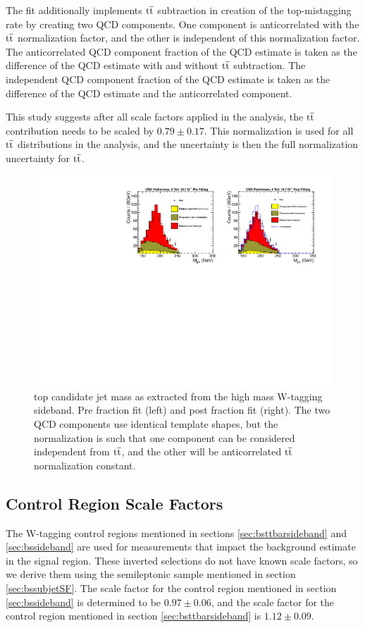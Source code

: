 The fit additionally implements $\mathrm{t\overline{t}}$ subtraction in creation of the top-mistagging rate by creating two QCD components.  One component is anticorrelated 
with the $\mathrm{t\overline{t}}$ normalization factor, and the other is independent of this normalization factor.  The anticorrelated QCD component fraction of the QCD estimate 
is taken as the difference of the QCD estimate with and without $\mathrm{t\overline{t}}$ subtraction.  The independent QCD component fraction of the QCD estimate is taken as the 
difference of the QCD estimate and the anticorrelated component.  

This study suggests after all scale factors applied in the analysis, the $\mathrm{t\overline{t}}$ contribution needs to be scaled by $0.79 \pm 0.17$.  
This normalization is used for all $\mathrm{t\overline{t}}$ distributions in the analysis, and the uncertainty is then the full normalization uncertainty for $\mathrm{t\overline{t}}$.

\begin{figure}[htcb]
\centering
\includegraphics[width=1.0\textwidth]{AN-14-049/figs/ttbarfittingfromtheta.pdf}
\caption{top candidate jet mass as extracted from the high mass W-tagging sideband.  Pre fraction fit (left) and post fraction fit (right).  The two QCD components use identical template shapes,
but the normalization is such that one component can be considered independent from $\mathrm{t\overline{t}}$, and the other will be anticorrelated $\mathrm{t\overline{t}}$ normalization constant. }
\label{figs:bsttbarfit}
\end{figure}

\subsection{Control Region Scale Factors}
\label{sec:bsCRSF}
The W-tagging control regions mentioned in sections \ref{sec:bsttbarsideband} and \ref{sec:bssideband} are used for measurements that impact the background estimate in the signal region.  
These  inverted selections do not have known scale factors, so we derive them using the semileptonic sample mentioned in section \ref{sec:bssubjetSF}.  The scale factor for the control region mentioned in 
section \ref{sec:bssideband} is determined to be $0.97 \pm 0.06$, and the scale factor for the control region mentioned in section \ref{sec:bsttbarsideband} is $1.12 \pm 0.09$.  

